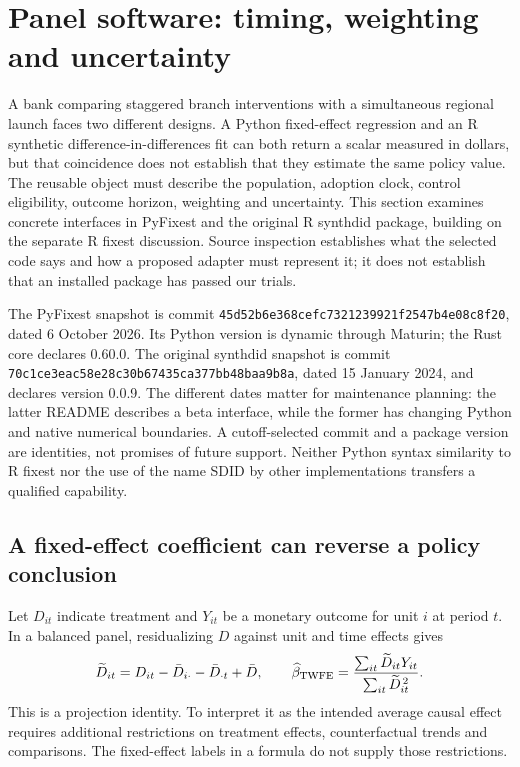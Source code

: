 \section{Panel software: timing, weighting and uncertainty}
\label{exec23:panel-scope}

A bank comparing staggered branch interventions with a simultaneous regional
launch faces two different designs. A Python fixed-effect regression and an R
synthetic difference-in-differences fit can both return a scalar measured in
dollars, but that coincidence does not establish that they estimate the same
policy value. The reusable object must describe the population, adoption clock,
control eligibility, outcome horizon, weighting and uncertainty. This section
examines concrete interfaces in PyFixest and the original R synthdid package,
building on the separate R fixest discussion. Source inspection establishes
what the selected code says and how a proposed adapter must represent it; it
does not establish that an installed package has passed our trials.
\citep{exec23_pyfixest_reuse_source,exec23_synthdid_reuse_source}

The PyFixest snapshot is commit
\texttt{45d52b6e368cefc7321239921f2547b4e08c8f20}, dated 6 October 2026.
Its Python version is dynamic through Maturin; the Rust core declares 0.60.0.
The original synthdid snapshot is commit
\texttt{70c1ce3eac58e28c30b67435ca377bb48baa9b8a}, dated 15 January 2024,
and declares version 0.0.9. The different dates matter for maintenance planning:
the latter README describes a beta interface, while the former has changing
Python and native numerical boundaries. A cutoff-selected commit and a package
version are identities, not promises of future support. Neither Python syntax
similarity to R fixest nor the use of the name SDID by other implementations
transfers a qualified capability.
\citep{exec23_pyfixest_reuse_source,exec23_synthdid_reuse_source}

\subsection{A fixed-effect coefficient can reverse a policy conclusion}
\label{exec23:panel-projection}
Let $D_{it}$ indicate treatment and $Y_{it}$ be a monetary outcome for unit $i$
at period $t$. In a balanced panel, residualizing $D$ against unit and time
effects gives
\begin{equation}
 \widetilde D_{it}=D_{it}-\bar D_{i\cdot}-\bar D_{\cdot t}+\bar D,
 \qquad
 \widehat\beta_{\rm TWFE}=
 \frac{\sum_{it}\widetilde D_{it}Y_{it}}
      {\sum_{it}\widetilde D_{it}^{\,2}}.
 \label{exec23:panel-twfe}
\end{equation}
This is a projection identity. To interpret it as the intended average causal
effect requires additional restrictions on treatment effects, counterfactual
trends and comparisons. The fixed-effect labels in a formula do not supply
those restrictions.

